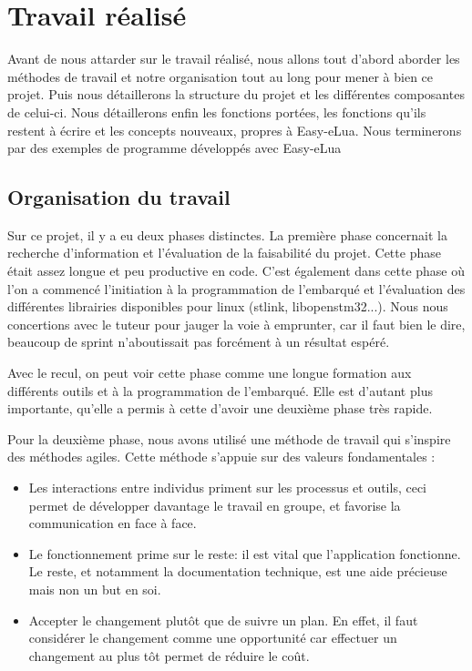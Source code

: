 \part{Travail réalisé}
\newpage
Avant de nous attarder sur le travail réalisé, nous allons tout d’abord aborder les méthodes de travail et notre organisation tout au long pour mener à bien ce projet. Puis nous détaillerons la structure du projet et les différentes composantes de celui-ci.  Nous détaillerons enfin les fonctions portées, les fonctions qu’ils restent à écrire et les concepts nouveaux, propres à Easy-eLua. Nous terminerons  par des exemples de programme développés avec Easy-eLua

\chapter[Organisation du travail]{Organisation du travail}
\label{chap:chap5}

Sur ce projet, il y a eu deux phases distinctes. La première phase concernait la recherche d’information et l’évaluation de la 
faisabilité du projet. Cette phase était assez longue et peu productive en code.  C’est également dans cette phase où l’on a commencé 
l’initiation à la programmation de l’embarqué et l’évaluation des différentes librairies disponibles pour linux (stlink, libopenstm32...).
 Nous nous concertions avec le tuteur pour jauger la voie à emprunter, car il faut bien le dire, beaucoup de sprint n’aboutissait 
pas forcément à un résultat espéré.

Avec le recul, on peut voir cette phase comme une longue formation aux différents outils et à la programmation de l’embarqué.
Elle est d’autant plus importante, qu’elle a permis à cette d’avoir une deuxième phase très rapide. 

Pour la deuxième phase, nous avons utilisé une méthode de travail qui s'inspire des méthodes agiles. Cette méthode s'appuie sur des 
valeurs fondamentales :

\begin{itemize}
 \item Les interactions entre individus priment sur les processus et outils, ceci permet de développer davantage le travail en groupe, et favorise la communication en face à face. 
 \item Le fonctionnement prime sur le reste: il est vital que l'application fonctionne. Le reste, et notamment la documentation technique, 
est une aide précieuse mais non un but en soi.
 \item Accepter le changement plutôt que de suivre un plan. En effet, il faut considérer le changement comme une opportunité car effectuer un changement au plus tôt  permet de réduire le coût. 
\end{itemize}
 
